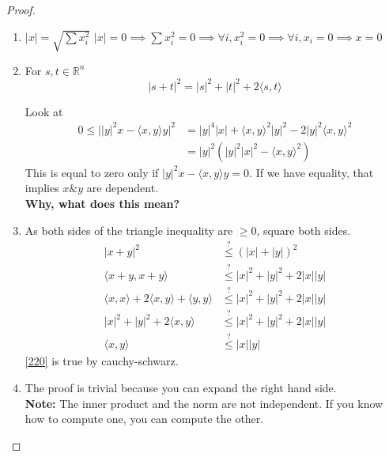 \documentclass[a4paper]{article}
\numberwithin{equation}{section}
\begin{document}
\begin{proposition}
    \begin{proof}
        \begin{enumerate}
            \item $|x|=\sqrt{\sum x_i^2}$
            $|x|=0\implies\sum x_i^2=0\implies\forall i, x_i^2=0\implies \forall i,x_i=0\implies x=0$
            \item 
            For $s,t\in\mathbb R^n$
            \begin{equation}
                |s+t|^2=|s|^2+|t|^2+2\langle s,t \rangle
            \end{equation}
    
            Look at 
            \begin{align}
                0\leq\Big||y|^2x-\langle x,y\rangle y\Big|^2&=|y|^4|x|+\langle x,y\rangle^2|y|^2-2|y|^2\langle x,y\rangle^2\\
                &=|y|^2\left(|y|^2|x|^2-\langle x,y \rangle^2\right)
            \end{align}
            This is equal to zero only if $|y|^2x-\langle x,y\rangle y=0$. If we have equality, that implies $x\&y$ are dependent.
            \\\textbf{Why, what does this mean?}
            \item {}
            As both sides of the triangle inequality are $\geq0$, square both sides.
            \begin{align}
                |x+y|^2&\stackrel{?}{\leq}(|x|+|y|)^2\\
                \langle x+y, x+y \rangle&\stackrel{?}{\leq}|x|^2+|y|^2+2|x||y|\\
                \langle x,x\rangle + 2\langle x,y\rangle + \langle y,y\rangle &\stackrel{?}{\leq}|x|^2+|y|^2+2|x||y|\\
                |x|^2+|y|^2+2\langle x,y\rangle &\stackrel{?}{\leq}|x|^2+|y|^2+2|x||y|\\
                \langle x,y\rangle &\stackrel{?}{\leq}|x||y|\label{220}
            \end{align}
            \eqref{220} is true by cauchy-schwarz.
            \item The proof is trivial because you can expand the right hand side.
            \\\textbf{Note:} The inner product and the norm are not independent. If you know how to compute one, you can compute the other.
        \end{enumerate}
    \end{proof}
\end{proposition}
\end{document}
